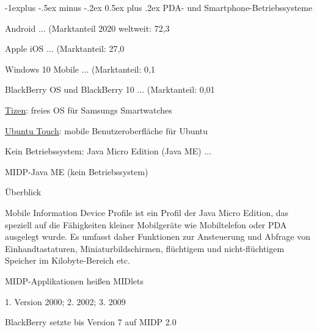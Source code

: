 \documentclass[a4paper]{article}
\makeatletter
\renewcommand{\subsection}{\@startsection{subsection}{2}{0mm}%
                                {-1explus -.5ex minus -.2ex}%
                                {0.5ex plus .2ex}%
                                {\normalfont\normalsize\bfseries}}
\makeatother
\begin{document}
\begin{multicols*}{2}
  \subsection{PDA- und Smartphone-Betriebssysteme}
  \begin{itemize*}
    \item Android ... (Marktanteil 2020 weltweit: 72,3%
    \item Apple iOS ... (Marktanteil: 27,0%
    \item Windows 10 Mobile ... (Marktanteil: 0,1%
    \item BlackBerry OS und BlackBerry 10 ... (Marktanteil: 0,01%
    \item \href{http://de.wikipedia.org/wiki/Tizen}{Tizen}: freies OS für Samsungs Smartwatches
    \item \href{http://de.wikipedia.org/wiki/Ubuntu_Touch}{Ubuntu Touch}: mobile Benutzeroberfläche für Ubuntu
    \item Kein Betriebssystem: Java Micro Edition (Java ME) ...
  \end{itemize*}

  MIDP-Java ME (kein Betriebssystem)
  \begin{itemize*}
    \item Überblick
    \begin{itemize*}
      \item Mobile Information Device Profile ist ein Profil der Java Micro Edition, das speziell auf die Fähigkeiten kleiner Mobilgeräte wie Mobiltelefon oder PDA ausgelegt wurde. Es umfasst daher Funktionen zur Ansteuerung und Abfrage von Einhandtastaturen, Miniaturbildschirmen, flüchtigem und nicht-flüchtigem Speicher im Kilobyte-Bereich etc.
      \item MIDP-Applikationen heißen MIDlets
    \end{itemize*}
    \item 1. Version 2000; 2. 2002; 3. 2009
    \item BlackBerry setzte bis Version 7 auf MIDP 2.0
  \end{itemize*}


\end{multicols*}
\end{document}
